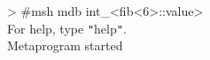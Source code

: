 
> \#msh mdb int\_<fib<6>::value> \\
For help, type \texttt{"}help\texttt{"}. \\
Metaprogram started

